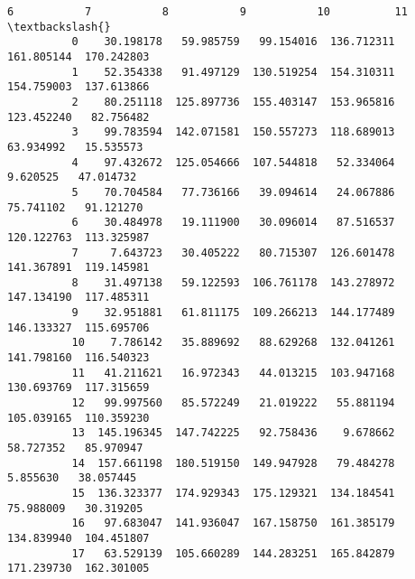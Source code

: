 \documentclass[11pt]{article}
\begin{document}
\begin{Verbatim}[commandchars=\\\{\}]
                      6           7           8           9           10          11  \textbackslash{}
          0    30.198178   59.985759   99.154016  136.712311  161.805144  170.242803   
          1    52.354338   91.497129  130.519254  154.310311  154.759003  137.613866   
          2    80.251118  125.897736  155.403147  153.965816  123.452240   82.756482   
          3    99.783594  142.071581  150.557273  118.689013   63.934992   15.535573   
          4    97.432672  125.054666  107.544818   52.334064    9.620525   47.014732   
          5    70.704584   77.736166   39.094614   24.067886   75.741102   91.121270   
          6    30.484978   19.111900   30.096014   87.516537  120.122763  113.325987   
          7     7.643723   30.405222   80.715307  126.601478  141.367891  119.145981   
          8    31.497138   59.122593  106.761178  143.278972  147.134190  117.485311   
          9    32.951881   61.811175  109.266213  144.177489  146.133327  115.695706   
          10    7.786142   35.889692   88.629268  132.041261  141.798160  116.540323   
          11   41.211621   16.972343   44.013215  103.947168  130.693769  117.315659   
          12   99.997560   85.572249   21.019222   55.881194  105.039165  110.359230   
          13  145.196345  147.742225   92.758436    9.678662   58.727352   85.970947   
          14  157.661198  180.519150  149.947928   79.484278    5.855630   38.057445   
          15  136.323377  174.929343  175.129321  134.184541   75.988009   30.319205   
          16   97.683047  141.936047  167.158750  161.385179  134.839940  104.451807   
          17   63.529139  105.660289  144.283251  165.842879  171.239730  162.301005   
          

\end{Verbatim}
\end{document}
